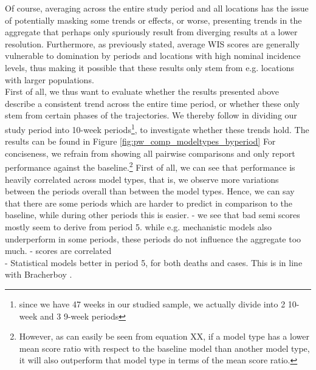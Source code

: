 Of course, averaging across the entire study period and all locations has the issue of potentially masking some trends or effects, or worse, presenting trends in the aggregate that perhaps only spuriously result from diverging results at a lower resolution. Furthermore, as previously stated, average WIS scores are generally vulnerable to domination by periods and locations with high nominal incidence levels, thus making it possible that these results only stem from e.g. locations with larger populations.\\ 
First of all, we thus want to evaluate whether the results presented above describe a consistent trend across the entire time period, or whether these only stem from certain phases of the trajectories. We thereby follow \cite{taylor_combining_2021} in dividing our study period into 10-week periods\footnote{since we have 47 weeks in our studied sample, we actually divide into 2 10-week and 3 9-week periods}, to investigate whether these trends hold. The results can be found in Figure \ref{fig:pw_comp_modeltypes_byperiod} For conciseness, we refrain from showing all pairwise comparisons and only report performance against the baseline.\footnote{However, as can easily be seen from equation XX, if a model type has a lower mean score ratio with respect to the baseline model than another model type, it will also outperform that model type in terms of the mean score ratio.}
First of all, we can see that performance is heavily correlated across model types, that is, we observe more variations between the periods overall than between the model types. Hence, we can say that there are some periods which are harder to predict in comparison to the baseline, while during other periods this is easier. %
- we see that bad semi scores mostly seem to derive from period 5. while e.g. mechanistic models also underperform in some periods, these periods do not influence the aggregate too much.
- scores are correlated\\
- Statistical models better in period 5, for both deaths and cases. This is in line with Bracherboy .\\
